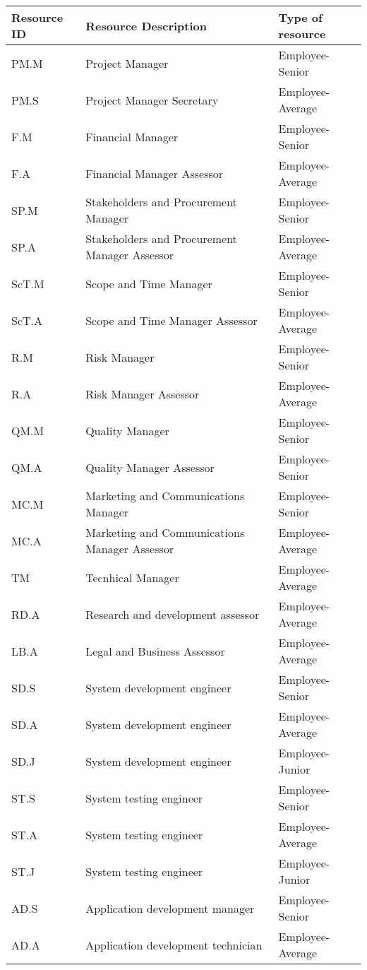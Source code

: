 \begin{longtable}{lll}
	
\toprule[2pt]

\textbf{Resource ID} & \textbf{Resource Description} & \textbf{Type of resource}  
		\\ \midrule[1.5pt] 
	
PM.M&Project Manager&Employee-Senior\\
PM.S&Project Manager Secretary&Employee-Average\\
F.M&Financial Manager&Employee-Senior\\
F.A&Financial Manager Assessor&Employee-Average\\
SP.M&Stakeholders and Procurement Manager&Employee-Senior\\
SP.A&Stakeholders and Procurement Manager Assessor&Employee-Average\\
ScT.M&Scope and Time Manager&Employee-Senior\\
ScT.A&Scope and Time Manager Assessor&Employee-Average\\
R.M&Risk Manager&Employee-Senior\\
R.A&Risk Manager Assessor&Employee-Average\\
QM.M&Quality Manager&Employee-Senior\\
QM.A&Quality Manager Assessor&Employee-Senior\\
MC.M&Marketing and Communications Manager&Employee-Senior\\
MC.A&Marketing and Communications Manager Assessor&Employee-Average\\
TM&Tecnhical Manager&Employee-Average\\
RD.A&Research and development assessor&Employee-Average\\
LB.A&Legal and Business Assessor&Employee-Average\\
SD.S&System development engineer&Employee-Senior\\
SD.A&System development engineer&Employee-Average\\
SD.J&System development engineer&Employee-Junior\\
ST.S&System testing engineer&Employee-Senior\\
ST.A&System testing engineer&Employee-Average\\
ST.J&System testing engineer&Employee-Junior\\
AD.S&Application development manager&Employee-Senior\\
AD.A&Application development technician&Employee-Average\\

\end{longtable}
